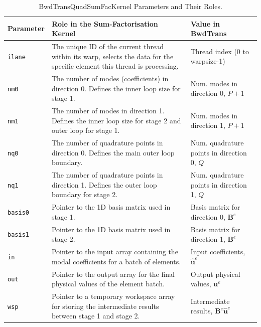 \begin{table}[h!]
\centering
\caption{BwdTransQuadSumFacKernel Parameters and Their Roles.}
\label{tab:sumfackernel_params}
\begin{tabularx}{\textwidth}{l p{6.5cm} X}
\toprule
\textbf{Parameter} & \textbf{Role in the Sum-Factorisation Kernel} & \textbf{Value in BwdTrans} \\
\midrule
\texttt{ilane}     & The unique ID of the current thread within its warp, selects the data for the specific element this thread is processing. & Thread index (0 to warpsize-1) \\
\texttt{nm0}       & The number of modes (coefficients) in direction 0. Defines the inner loop size for stage 1. & Num. modes in direction 0, $P+1$ \\
\texttt{nm1}       & The number of modes in direction 1. Defines the inner loop size for stage 2 and outer loop for stage 1. & Num. modes in direction 1, $P+1$ \\
\texttt{nq0}       & The number of quadrature points in direction 0. Defines the main outer loop boundary. & Num. quadrature points in direction 0, $Q$ \\
\texttt{nq1}       & The number of quadrature points in direction 1. Defines the outer loop boundary for stage 2. & Num. quadrature points in direction 1, $Q$ \\
\texttt{basis0}    & Pointer to the 1D basis matrix used in stage 1. & Basis matrix for direction 0, $\mathbf{B}^e$ \\
\texttt{basis1}    & Pointer to the 1D basis matrix used in stage 2. & Basis matrix for direction 1, $\mathbf{B}^e$         \\
\texttt{in}        & Pointer to the input array containing the modal coefficients for a batch of elements. & Input coefficients, $\mathbf{\hat{u}}^e$ \\
\texttt{out}       & Pointer to the output array for the final physical values of the element batch. & Output physical values, $\mathbf{u}^e$ \\
\texttt{wsp}       & Pointer to a temporary workspace array for storing the intermediate results between stage 1 and stage 2. & Intermediate results, $\mathbf{B}^e \mathbf{\hat{u}}^e$ \\
\bottomrule
\end{tabularx}
\end{table}

